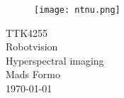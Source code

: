 \documentclass{article}
\begin{document}
\begin{titlepage}
      \begin{center}
        \begin{figure}[h!]
            \centering
            \texttt{[image: ntnu.png]}
            \label{fig:ntnu}
        \end{figure}
        \vspace*{1cm}
        {\Large{TTK4255}}\\[0.4cm] 
        \Huge{Robotvision}\\[0.5cm]
        {\Large{Hyperspectral imaging}\vspace*{0.5cm}\\ Mads Formo }\\[0.4cm] 
        \large{\today}
        \vspace{1cm}
    \end{center}
    \vspace*{\fill}
\end{titlepage}



\thispagestyle{empty} %
\linespread{1.15}
\newpage
\tableofcontents{}
\def\tableofcontentsname{test}
\thispagestyle{empty} %


\newpage
\setcounter{page}{1}
%




% 


%


\newpage
{}
\printbibliography{}
\label{sec:references}
\end{document}
